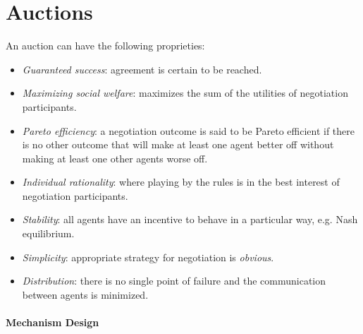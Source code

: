 \documentclass[10pt,a4paper]{article}
\begin{document}
\newpage





\section{Auctions}
An auction can have the following proprieties:

\begin{itemize}
\item \textit{Guaranteed success}: agreement is certain to be reached.
\item \textit{Maximizing social welfare}: maximizes the sum of the utilities of negotiation participants.
\item \textit{Pareto efficiency}: a negotiation outcome is said to be Pareto efficient if there is no other outcome that will make at least one agent better off without making at least one other agents worse off.
\item \textit{Individual rationality}: where playing by the rules is in the best interest of negotiation participants.
\item \textit{Stability}: all agents have an incentive to behave in a particular way, e.g. Nash equilibrium.
\item \textit{Simplicity}: appropriate strategy for negotiation is \textit{obvious}.
\item \textit{Distribution}: there is no single point of failure and the communication between agents is minimized.

\end{itemize}

\paragraph{Mechanism Design}
\end{document}
